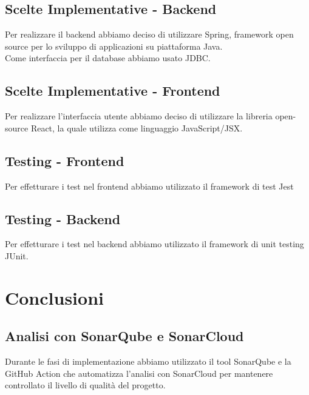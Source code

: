 \documentclass[a4paper,12pt]{report}
\begin{document}
      \section{Scelte Implementative - Backend}
Per realizzare il backend abbiamo deciso di utilizzare Spring, framework open source per lo sviluppo di applicazioni su piattaforma Java.\\
Come interfaccia per il database abbiamo usato JDBC.\\
   	\section{Scelte Implementative - Frontend}
Per realizzare l'interfaccia utente abbiamo deciso di utilizzare la libreria open-source React, la quale utilizza come linguaggio JavaScript/JSX.

   	\section{Testing - Frontend}
Per effetturare i test nel frontend abbiamo utilizzato il framework di test Jest

   	\section{Testing - Backend}
Per effetturare i test nel backend abbiamo utilizzato il framework di unit testing JUnit.
							
      \chapter{Conclusioni}
    
     	\section{Analisi con SonarQube e SonarCloud}
Durante le fasi di implementazione abbiamo utilizzato il tool SonarQube e la GitHub Action che automatizza l'analisi con SonarCloud per mantenere controllato il livello di qualità del progetto.\\
\end{document}
